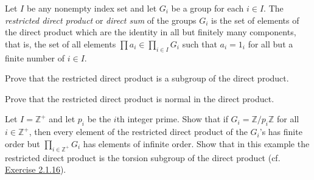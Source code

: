 \begin{exercise}\label{ex5.1.17}
    Let $I$ be any nonempty index set and let $G_i$ be a group for each $i \in I$. The \textit{restricted direct product} or \textit{direct sum} of the groups $G_i$ is the set of elements of the direct product which are the identity in all but finitely many components, that is, the set of all elements $\prod a_i \in \prod_{i \in I} G_i$ such that $a_i = 1_i$ for all but a finite number of $i \in I$.
    \begin{subproblems}
        \item Prove that the restricted direct product is a subgroup of the direct product.
        \item Prove that the restricted direct product is normal in the direct product.
        \item Let $I = \mathbb{Z}^+$ and let $p_i$ be the $i$th integer prime. Show that if $G_i = \mathbb{Z}/p_i\mathbb{Z}$ for all $i \in \mathbb{Z}^+$, then every element of the restricted direct product of the $G_i$'s has finite order but $\prod_{i \in \mathbb{Z}^+} G_i$ has elements of infinite order. Show that in this example the restricted direct product is the torsion subgroup of the direct product (cf. \hyperref[ex2.1.16]{Exercise 2.1.16}).
    \end{subproblems}
\end{exercise}


